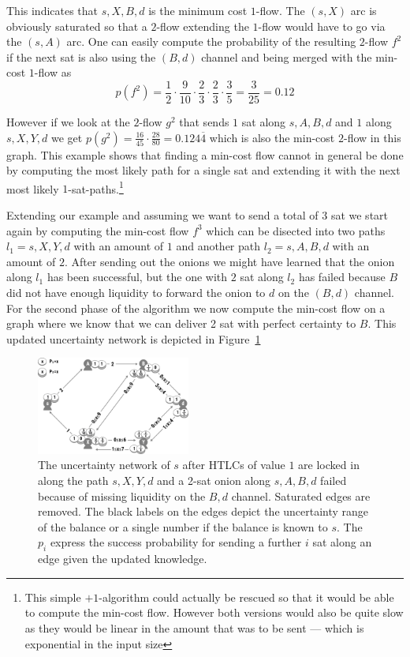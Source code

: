 \documentclass[10pt,twocolumn]{article}
\begin{document}
This indicates that $s,X,B,d$ is the minimum cost $1$-flow.
The $(s,X)$ arc is obviously saturated so that a $2$-flow extending the $1$-flow would have to go via the $(s,A)$ arc.
One can easily compute the probability of the resulting $2$-flow $f^2$ if the next sat is also using the $(B,d)$ channel and being merged with the min-cost $1$-flow as
\[
p(f^2) = \frac{1}{2}\cdot \frac{9}{10}\cdot \frac{2}{3}\cdot \frac{2}{3}\cdot \frac{3}{5} = \frac{3}{25}=0.12
\]

However if we look at the $2$-flow $g^2$ that sends $1$ sat along $s,A,B,d$ and $1$ along $s,X,Y,d$ we get $p(g^2)=\frac{16}{45}\cdot\frac{28}{80} = 0.124\overline{4}$
which is also the min-cost $2$-flow in this graph.
This example shows that finding a min-cost flow cannot in general be done  by computing the most likely path for a single sat and extending it with the next most likely $1$-sat-paths.\footnote{This simple $+1$-algorithm could actually be rescued so that it would be able to compute the min-cost flow. However both versions would also be quite slow as they would be linear in the amount that was to be sent --- which is exponential in the input size}

Extending our example and assuming we want to send a total of 3 sat we start again by computing the min-cost flow $f^3$ which can be disected into two paths $l_1= s,X,Y,d$ with an amount of $1$ and another path $l_2=s,A,B,d$ with an amount of $2$.
After sending out the onions we might have learned that the onion along $l_1$ has been successful, but the one with $2$ sat along $l_2$ has failed because $B$ did not have enough liquidity to forward the onion to $d$ on the $(B,d)$ channel.
For the second phase of the algorithm we now compute the min-cost flow on a graph where we know that we can deliver 2 sat with perfect certainty to $B$.
This updated uncertainty network is depicted in Figure~\ref{fig:round2}
\begin{figure}[htpb]
  \center
  \includegraphics[width=0.45\textwidth]{img/round2.png}
\caption{The uncertainty network of $s$ after HTLCs of value $1$ are locked in along the path $s,X,Y,d$ and a 2-sat onion along $s,A,B,d$ failed because of missing liquidity on the $B,d$ channel. Saturated edges are removed. The black labels on the edges depict the uncertainty range of the balance or a single number if the balance is known to $s$. The $p_i$ express the success probability for sending a further $i$ sat along an edge given the updated knowledge. }

  \label{fig:round2}
\end{figure}
\end{document}
